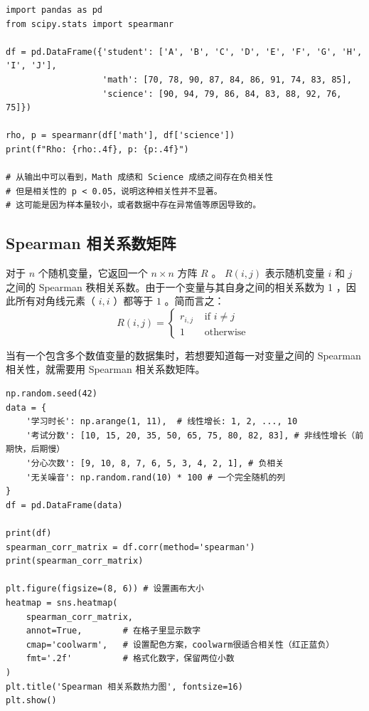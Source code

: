 \begin{lstlisting}[style=python]
import pandas as pd
from scipy.stats import spearmanr

df = pd.DataFrame({'student': ['A', 'B', 'C', 'D', 'E', 'F', 'G', 'H', 'I', 'J'],
                   'math': [70, 78, 90, 87, 84, 86, 91, 74, 83, 85],
                   'science': [90, 94, 79, 86, 84, 83, 88, 92, 76, 75]})

rho, p = spearmanr(df['math'], df['science'])
print(f"Rho: {rho:.4f}, p: {p:.4f}")

# 从输出中可以看到，Math 成绩和 Science 成绩之间存在负相关性
# 但是相关性的 p < 0.05，说明这种相关性并不显著。
# 这可能是因为样本量较小，或者数据中存在异常值等原因导致的。
\end{lstlisting}

\subsection{Spearman 相关系数矩阵}

\begin{definition}[相关系数矩阵]
    对于 $n$ 个随机变量，它返回一个 $n \times n$ 方阵 $R$ 。 $R(i, j)$ 表示随机变量 $i$ 和 $j$ 之间的 Spearman 秩相关系数。由于一个变量与其自身之间的相关系数为 1 ，因此所有对角线元素（ $i, i$ ）都等于 $1$ 。简而言之：
    $$
        R(i, j)= \begin{cases}r_{i, j} & \text { if } i \neq j \\ 1 & \text { otherwise }\end{cases}
    $$
\end{definition}

当有一个包含多个数值变量的数据集时，若想要知道每一对变量之间的 Spearman 相关性，就需要用 Spearman 相关系数矩阵。

\begin{lstlisting}[style=python]
np.random.seed(42)
data = {
    '学习时长': np.arange(1, 11),  # 线性增长: 1, 2, ..., 10
    '考试分数': [10, 15, 20, 35, 50, 65, 75, 80, 82, 83], # 非线性增长（前期快，后期慢）
    '分心次数': [9, 10, 8, 7, 6, 5, 3, 4, 2, 1], # 负相关
    '无关噪音': np.random.rand(10) * 100 # 一个完全随机的列
}
df = pd.DataFrame(data)

print(df)
spearman_corr_matrix = df.corr(method='spearman')
print(spearman_corr_matrix)

plt.figure(figsize=(8, 6)) # 设置画布大小
heatmap = sns.heatmap(
    spearman_corr_matrix,
    annot=True,        # 在格子里显示数字
    cmap='coolwarm',   # 设置配色方案，coolwarm很适合相关性（红正蓝负）
    fmt='.2f'          # 格式化数字，保留两位小数
)
plt.title('Spearman 相关系数热力图', fontsize=16)
plt.show()
\end{lstlisting}
